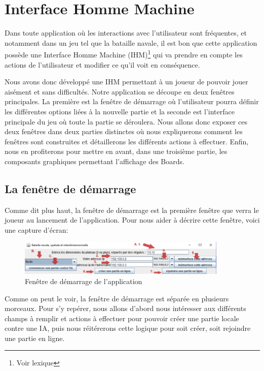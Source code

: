 \section{Interface Homme Machine}
	Dans toute application où les interactions avec l'utilisateur sont fréquentes, et notamment dans un jeu tel que la bataille navale, il est bon que cette application possède une Interface Homme Machine (IHM)\footnote{Voir lexique} qui va prendre en compte les actions de l'utilisateur et modifier ce qu'il voit en conséquence. \newline
	
	Nous avons donc développé une IHM permettant à un joueur de pouvoir jouer aisément et sans difficultés. Notre application se découpe en deux fenêtres principales. La première est la fenêtre de démarrage où l'utilisateur pourra définir les différentes options liées à la nouvelle partie et la seconde est l'interface principale du jeu où toute la partie se déroulera. Nous allons donc exposer ces deux fenêtres dans deux parties distinctes où nous expliquerons comment les fenêtres sont construites et détaillerons les différents actions à effectuer. Enfin, nous en profiterons pour mettre en avant, dans une troisième partie, les composants graphiques permettant l'affichage des Boards.
	
\subsection{La fenêtre de démarrage}
	Comme dit plus haut, la fenêtre de démarrage est la première fenêtre que verra le joueur au lancement de l'application. Pour nous aider à décrire cette fenêtre, voici une capture d'écran:
	
	\begin{figure}[!h]
		\centering
		\includegraphics [width=10cm]{images/start_window.png}
		\caption{Fenêtre de démarrage de l'application}
		\label {startwindow}
	\end{figure}
	
	Comme on peut le voir, la fenêtre de démarrage est séparée en plusieurs morceaux. Pour s'y repérer, nous allons d'abord nous intéresser aux différents champs à remplir et actions à effectuer pour pouvoir créer une partie locale contre une IA, puis nous réitérerons cette logique pour soit créer, soit rejoindre une partie en ligne.
	
